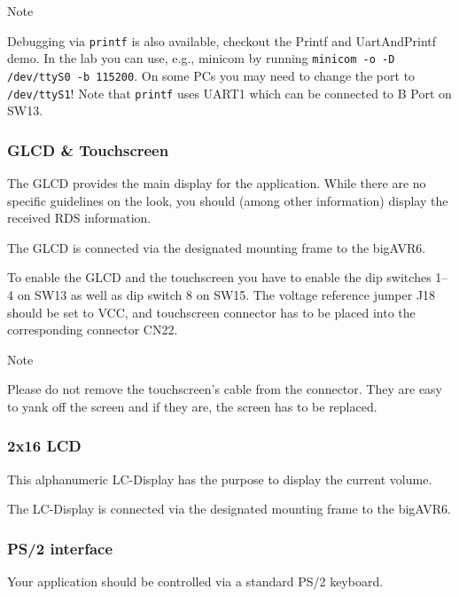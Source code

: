 \documentclass[a4paper,10pt]{article}
\newenvironment{note}[1][Note]{%
	\begin{bclogo}[noborder=true,logo=\bcinfo]{#1}
}
{\end{bclogo}}
\begin{document}
\begin{note}
	Debugging via \texttt{printf} is also available, checkout the Printf and
		UartAndPrintf demo.
	In the lab you can use, e.g., minicom by running \texttt{minicom -o -D
		/dev/ttyS0 -b 115200}.
	On some PCs you may need to change the port to \texttt{/dev/ttyS1}!
	Note that \texttt{printf} uses UART1 which can be connected to B Port on
		SW13.
\end{note}


\subsubsection{GLCD \& Touchscreen}
The GLCD provides the main display for the application.
While there are no specific guidelines on the look, you should (among other information) display 
the received RDS information.

The GLCD is connected via the designated mounting frame to the bigAVR6.

To enable the GLCD and the touchscreen you have to enable the dip switches
	1--4 on SW13 as well as dip switch 8 on SW15.
The voltage reference jumper J18 should be set to VCC, and touchscreen
	connector has to be placed into the corresponding connector CN22.

\begin{note}
	Please do not remove the touchscreen's cable from the connector.
	They are easy to yank off the screen and if they are, the screen has to be
		replaced.
\end{note}


\subsubsection{2x16 LCD}
This alphanumeric LC-Display has the purpose to display the current volume.

The LC-Display is connected via the designated mounting frame to the bigAVR6.

\subsubsection{PS/2 interface}
Your application should be controlled via a standard PS/2 keyboard.
\end{document}
